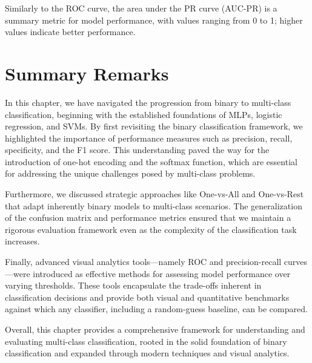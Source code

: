 \documentclass[12pt]{article}
\begin{document}
Similarly to the ROC curve, the area under the PR curve (AUC-PR) is a summary metric for model performance, with values ranging from 0 to 1; higher values indicate better performance.

\section{Summary Remarks}
In this chapter, we have navigated the progression from binary to multi-class classification, beginning with the established foundations of MLPs, logistic regression, and SVMs. By first revisiting the binary classification framework, we highlighted the importance of performance measures such as precision, recall, specificity, and the F1 score. This understanding paved the way for the introduction of one-hot encoding and the softmax function, which are essential for addressing the unique challenges posed by multi-class problems.

Furthermore, we discussed strategic approaches like One-vs-All and One-vs-Rest that adapt inherently binary models to multi-class scenarios. The generalization of the confusion matrix and performance metrics ensured that we maintain a rigorous evaluation framework even as the complexity of the classification task increases.

Finally, advanced visual analytics tools—namely ROC and precision-recall curves—were introduced as effective methods for assessing model performance over varying thresholds. These tools encapsulate the trade-offs inherent in classification decisions and provide both visual and quantitative benchmarks against which any classifier, including a random-guess baseline, can be compared.

Overall, this chapter provides a comprehensive framework for understanding and evaluating multi-class classification, rooted in the solid foundation of binary classification and expanded through modern techniques and visual analytics.
\end{document}
